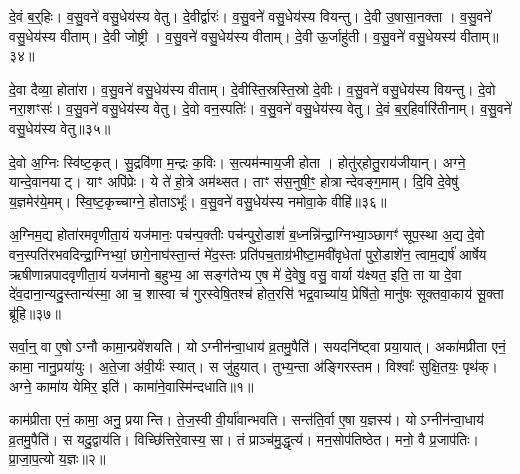 दे॒वं ब॒र्॒हिः।
व॒सु॒वने॑ वसु॒धेय॑स्य वेतु।
दे॒वीर्द्वारः॑।
व॒सु॒वने॑ वसु॒धेय॑स्य वियन्तु।
दे॒वी उ॒षासा॒नक्ता।
व॒सु॒वने॑ वसु॒धेय॑स्य वीताम्।
दे॒वी जोष्ट्री।
व॒सु॒वने॑ वसु॒धेय॑स्य वीताम्।
दे॒वी ऊ॒र्जाहु॑ती।
व॒सु॒वने॑ वसु॒धेयस्य॑ वीताम्॥३४॥

दे॒वा दैव्या॒ होता॑रा।
व॒सु॒वने॑ वसु॒धेय॑स्य वीताम्।
दे॒वीस्ति॒स्रस्ति॒स्रो दे॒वीः।
व॒सु॒वने॑ वसु॒धेय॑स्य वियन्तु।
दे॒वो नरा॒शꣳसः॑।
व॒सु॒वने॑ वसु॒धेय॑स्य वेतु।
दे॒वो वन॒स्पतिः॑।
व॒सु॒वने॑ वसु॒धेय॑स्य वेतु।
दे॒वं ब॒र्॒हिर्वारि॑तीनाम्।
व॒सु॒वने॑ वसु॒धेय॑स्य वेतु॥३५॥

दे॒वो अ॒ग्निः स्वि॑ष्ट॒कृत्।
सु॒द्रवि॑णा म॒न्द्रः क॒विः।
स॒त्यम॑न्माय॒जी होता।
होतु॑र्‌\mbox{}होतु॒राय॑जीयान्।
अग्ने॒ यान्दे॒वानयाट्।
याꣳ अपि॑प्रेः।
ये ते॑ हो॒त्रे अम॑थ्सत।
ताꣳ स॑स॒नुषी॒ꣳ॒ होत्रान्देवङ्ग॒माम्।
दि॒वि दे॒वेषु॑ य॒ज्ञमेर॑ये॒मम्।
स्वि॒ष्ट॒कृच्चाग्ने॒ होता\-ऽभूः᳚।
व॒सु॒वने॑ वसु॒धेय॑स्य नमोवा॒के वीहि॑॥३६॥\anuvakamend[वी॒तां॒ वे॒त्वभू॒रेकं॑ च]

अ॒ग्निम॒द्य होता॑रमवृणीता॒यं यज॑मानः॒ पच॑न्प॒क्तीः पच॑न्पुरो॒डाशं॑ ब॒ध्नन्नि॑न्द्रा॒ग्निभ्या॒ञ्छागꣳ॑ सूप॒स्था अ॒द्य दे॒वो वन॒स्पति॑रभवदिन्द्रा॒ग्निभ्यां॒ छागे॒नाघ॑स्ता॒न्तं मे॑द॒स्तः प्रति॑पच॒ताग्र॑भीष्टा॒मवी॑वृधेतां पुरो॒डाशे॑न॒ त्वाम॒द्यर्\mbox{}ष॑ आर्\mbox{}षेय ऋषीणान्नपादवृणीता॒यं यज॑मानो ब॒हुभ्य॒ आ सङ्ग॑तेभ्य ए॒ष मे॑ दे॒वेषु॒ वसु॒ वार्या य॑क्ष्यत॒ इति॒ ता या दे॒वा दे॑व॒दाना॒न्यदु॒स्तान्य॑स्मा॒ आ च॒ शास्वा च॑ गुरस्वेषि॒तश्च॑ होत॒रसि॑ भद्र॒वाच्या॑य॒ प्रेषि॑तो॒ मानु॑षः सूक्तवा॒काय॑ सू॒क्ता ब्रू॑हि॥३७॥\anuvakamend[अ॒ग्निम॒द्यैकम्]






\clearpage
{}
\setcounter{anuvakam}{0}

सर्वा॒न्॒ वा ए॒षो\-ऽग्नौ कामा॒न्प्रवे॑शयति।
योऽग्नीन॑न्वा॒धाय॑ व्र॒तमु॒पैति॑।
सयदनि॑ष्ट्वा प्रया॒यात्।
अका॑मप्रीता एनं॒ कामा॒ नानु॒प्रया॑युः।
अ॒ते॒जा अ॑वी॒र्यः॑ स्यात्।
स जु॑हुयात्।
तुभ्य॒न्ता अ॑ङ्गिरस्तम।
विश्वाः᳚ सुक्षि॒तयः॒ पृथ॑क्।
अग्ने॒ कामा॑य येमिर॒ इति॑।
कामा॑ने॒वास्मि॑न्दधाति॥१॥

काम॑प्रीता एनं॒ कामा॒ अनु॒ प्रयान्ति।
ते॒ज॒स्वी वी॒र्या॑वान्भवति।
सन्त॑ति॒र्वा ए॒षा य॒ज्ञस्य॑।
योऽग्नीन॑न्वा॒धाय॑ व्र॒तमु॒पैति॑।
स यदु॒द्वाय॑ति।
विच्छि॑त्तिरे॒वास्य॒ सा।
तं प्राञ्च॑मु॒द्धृत्य॑।
मन॒सोप॑तिष्ठेत।
मनो॒ वै प्र॒जाप॑तिः।
प्रा॒जा॒प॒त्यो य॒ज्ञः॥२॥

